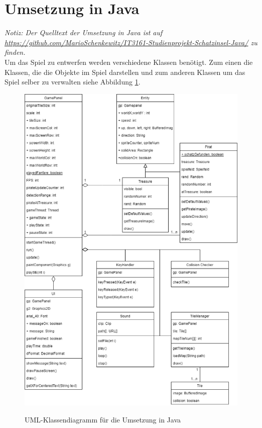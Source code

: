 \documentclass[
	12pt, %
	a4paper,
	listof=totoc, %
	bibliography=totoc, %
	numbers=noenddot, %
	ngerman, %
	headsepline, %
	oneside %
	]{scrbook} %
\begin{document}
\section{Umsetzung in Java}\label{sec:Umsetzung_Java}
\emph{Notiz: Der Quelltext der Umsetzung in Java ist auf \url{https://github.com/MarioSchenkewitz/IT3161-Studienprojekt-Schatzinsel-Java/} zu finden.}\\

Um das Spiel zu entwerfen werden verschiedene Klassen benötigt. Zum einen die Klassen, die die Objekte im Spiel darstellen und zum anderen Klassen um das Spiel selber zu verwalten siehe Abbildung \ref{fig:UML_Klassendiagramm_Java}.

\begin{figure}[H]
  \centering
  \includegraphics[scale=0.4]{bilder/UML_Klassendiagramm_Java.png}
  \label{fig:UML_Klassendiagramm_Java}       %
  \caption[UML-Klassendiagramm für die Umsetzung in Java]{UML-Klassendiagramm für die Umsetzung in Java}    %
\end{figure}
\end{document}
